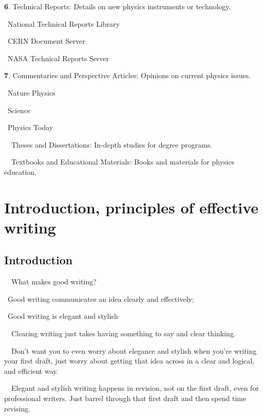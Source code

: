 \documentclass[a4paper, 12pt]{article}
\begin{document}
\textbf{6}. Technical Reports: Details on new physics instruments or technology.
\par\quad\textopenbullet\ National Technical Reports Library
\par\quad\textopenbullet\ CERN Document Server
\par\quad\textopenbullet\ NASA Technical Reports Server

\textbf{7}. Commentaries and Perspective Articles: Opinions on current physics issues.
\par\quad\textopenbullet\ Nature Physics
\par\quad\textopenbullet\ Science
\par\quad\textopenbullet\ Physics Today

\newpage\par\ \textbullet\ Theses and Dissertations: In-depth studies for degree programs.
\par\ \textbullet\ Textbooks and Educational Materials: Books and materials for physics education.

\newpage\section{Introduction, principles of effective writing}

\subsection{Introduction}

\par\ \textbullet\ What makes good writing?
\par\quad\textopenbullet\ Good writing communicates an idea clearly and effectively;
\par\quad\textopenbullet\ Good writing is elegant and stylish

\par\ \textbullet\ Clearing writing just takes having something to say and clear thinking.

\par\ \textbullet\ Don't want you to even worry about elegance and stylish when you're writing your first draft, just worry about getting that idea across in a clear and logical, and efficient way.

\par\ \textbullet\ Elegant and stylish writing happens in revision, not on the first draft, even for professional writers. Just barrel through that first draft and then spend time revising.
\end{document}

